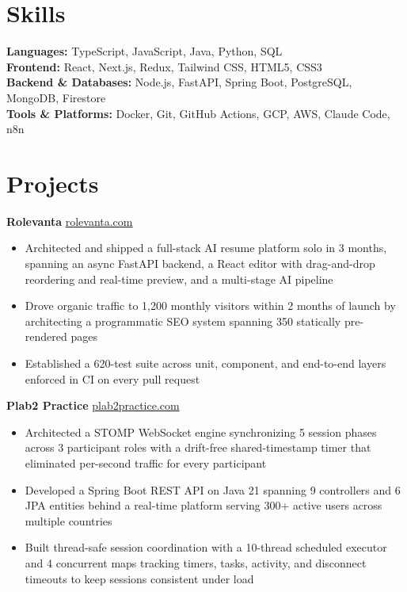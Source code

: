 \documentclass[11pt]{article}       %
\begin{document}
\vspace{-10.5pt}

\section*{Skills}
\textbf{Languages:} TypeScript, JavaScript, Java, Python, SQL \\
\textbf{Frontend:} React, Next.js, Redux, Tailwind CSS, HTML5, CSS3 \\
\textbf{Backend \& Databases:} Node.js, FastAPI, Spring Boot, PostgreSQL, MongoDB, Firestore \\
\textbf{Tools \& Platforms:} Docker, Git, GitHub Actions, GCP, AWS, Claude Code, n8n
\vspace{-5pt}






\section*{Projects}
\textbf{Rolevanta} \hfill \href{https://rolevanta.com}{rolevanta.com} \\
\vspace{-9pt}
\begin{itemize}
  \item Architected and shipped a full-stack AI resume platform solo in 3 months, spanning an async FastAPI backend, a React editor with drag-and-drop reordering and real-time preview, and a multi-stage AI pipeline
  \item Drove organic traffic to 1,200 monthly visitors within 2 months of launch by architecting a programmatic SEO system spanning 350 statically pre-rendered pages
  \item Established a 620-test suite across unit, component, and end-to-end layers enforced in CI on every pull request
\end{itemize}

\textbf{Plab2 Practice} \hfill \href{https://plab2practice.com}{plab2practice.com} \\
\vspace{-9pt}
\begin{itemize}
  \item Architected a STOMP WebSocket engine synchronizing 5 session phases across 3 participant roles with a drift-free shared-timestamp timer that eliminated per-second traffic for every participant
  \item Developed a Spring Boot REST API on Java 21 spanning 9 controllers and 6 JPA entities behind a real-time platform serving 300+ active users across multiple countries
  \item Built thread-safe session coordination with a 10-thread scheduled executor and 4 concurrent maps tracking timers, tasks, activity, and disconnect timeouts to keep sessions consistent under load
\end{itemize}
\end{document}
